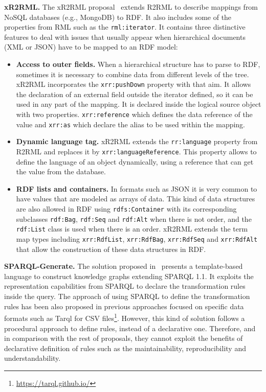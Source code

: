\noindent\textbf{xR2RML.} The xR2RML proposal~\citep{michel2015translation} extends R2RML to describe mappings from NoSQL databases (e.g., MongoDB) to RDF. It also includes some of the properties from RML such as the \texttt{rml:iterator}. It contains three distinctive features to deal with issues that usually appear when hierarchical documents (XML or JSON) have to be mapped to an RDF model:
\begin{itemize}
    \item \textbf{Access to outer fields.} When a hierarchical structure has to parse to RDF, sometimes it is necessary to combine data from different levels of the tree. xR2RML incorporates the \texttt{xrr:pushDown} property with that aim. It allows the declaration of an external field outside the iterator defined, so it can be used in any part of the mapping. It is declared inside the logical source object with two properties. \texttt{xrr:reference} which defines the data reference of the value and \texttt{xrr:as} which declare the alias to be used within the mapping.  
    \item \textbf{Dynamic language tag.} xR2RML extends the \texttt{rr:language} property from R2RML and replaces it by \texttt{xrr:languageReference}. This property allows to define the language of an object dynamically, using a reference that can get the value from the database.
    \item \textbf{RDF lists and containers.} In formats such as JSON it is very common to have values that are modeled as arrays of data. This kind of data structures are also allowed in RDF using \texttt{rdfs:Container} with its corresponding subclasses \texttt{rdf:Bag}, \texttt{rdf:Seq} and \texttt{rdf:Alt} when there is not order, and the \texttt{rdf:List} class is used when there is an order. xR2RML extends the term map types including \texttt{xrr:RdfList}, \texttt{xrr:RdfBag}, \texttt{xrr:RdfSeq} and \texttt{xrr:RdfAlt} that allow the construction of these data structures in RDF.
\end{itemize}

\noindent\textbf{SPARQL-Generate.} The solution proposed in~\citep{lefranccois2017sparql} presents a template-based language to construct knowledge graphs extending SPARQL 1.1. It exploits the representation capabilities from SPARQL to declare the transformation rules inside the query. The approach of using SPARQL to define the transformation rules has been also proposed in previous approaches focused on specific data formats such as Tarql for CSV files\footnote{\url{https://tarql.github.io/}}. However, this kind of solution follows a procedural approach to define rules, instead of a declarative one. Therefore, and in comparison with the rest of proposals, they cannot exploit the benefits of declarative definition of rules such as the maintainability, reproducibility and understandability.

